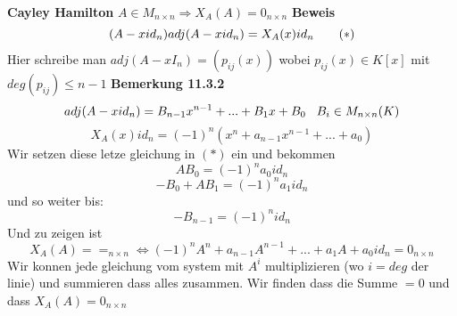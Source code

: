 \documentclass{article}
\newcommand{\mspc}{\hspace{0.7cm}}
\newcommand{\smspc}{\hspace{0.3cm}}
\begin{document}
\textbf{Cayley Hamilton} $A\in M_{n\times n} \Rightarrow X_A(A)=0_{n\times n}$
\newline\textbf{Beweis}\[(A-xid_n)adj(A-xid_n)=X_A(x)id_n\mspc (*)\] Hier schreibe man $adj(A-xI_n)=(p_{ij}(x))$ wobei $p_{ij}(x)\in K[x]$ mit $deg(p_{ij})\le n-1$
\newline \textbf{Bemerkung 11.3.2} \[adj(A-xid_n)=B_{n-1}x^{n-1}+...+B_1x+B_0\smspc B_i\in M_{n\times n }(K)\]\[X_A(x) id_n=(-1)^n(x^n+a_{n-1}x^{n-1}+...+a_0)\]Wir setzen diese letze gleichung in $(*)$ ein und bekommen \[AB_0=(-1)^na_0 id_n\]
\[-B_0+AB_1=(-1)^na_1 id_n\]
und so weiter bis:
\[-B_{n-1}=(-1)^nid_n\]
Und zu zeigen ist \[X_A(A)==_{n\times n}\Leftrightarrow (-1)^nA^n+a_{n-1}A^{n-1}+...+a_1A+a_0id_n=0_{n\times n}\]
Wir konnen jede gleichung vom system mit $A^i$ multiplizieren (wo $i=deg$ der linie) und summieren dass alles zusammen. Wir finden dass die Summe $=0$ und dass $X_A(A)=0_{n\times n}$
\end{document}

